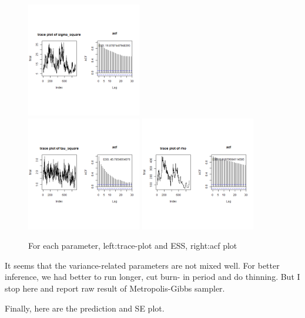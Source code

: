 \documentclass{article}
\begin{document}
\begin{figure}[!h]
    \includegraphics[height=5cm]{prob2_sigma_square.png} \\
    \includegraphics[height=5cm]{prob2_tau_square.png}
    \includegraphics[height=5cm]{prob2_rho.png}
    \caption{For each parameter, left:trace-plot and ESS, right:acf plot}
\end{figure}
\clearpage

It seems that the variance-related parameters are not mixed well. 
For better inference, we had better to run longer, cut burn- in period and do thinning.
But I stop here and report raw result of Metropolis-Gibbs sampler.

Finally, here are the prediction and SE plot.
\end{document}
